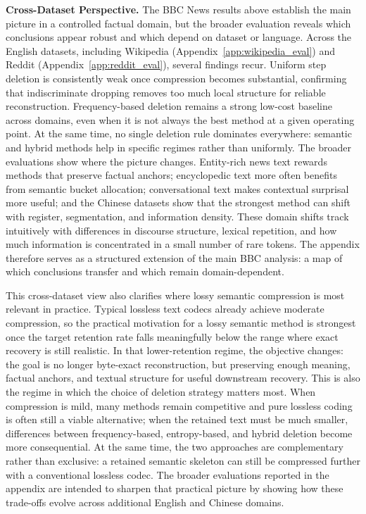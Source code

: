\documentclass[11pt]{article}
\begin{document}
\textbf{Cross-Dataset Perspective.}
The BBC News results above establish the main picture in a controlled factual domain, but the broader evaluation reveals which conclusions appear robust and which depend on dataset or language. Across the English datasets, including Wikipedia (Appendix~\ref{app:wikipedia_eval}) and Reddit (Appendix~\ref{app:reddit_eval}), several findings recur. Uniform step deletion is consistently weak once compression becomes substantial, confirming that indiscriminate dropping removes too much local structure for reliable reconstruction. Frequency-based deletion remains a strong low-cost baseline across domains, even when it is not always the best method at a given operating point. At the same time, no single deletion rule dominates everywhere: semantic and hybrid methods help in specific regimes rather than uniformly. The broader evaluations show where the picture changes. Entity-rich news text rewards methods that preserve factual anchors; encyclopedic text more often benefits from semantic bucket allocation; conversational text makes contextual surprisal more useful; and the Chinese datasets show that the strongest method can shift with register, segmentation, and information density. These domain shifts track intuitively with differences in discourse structure, lexical repetition, and how much information is concentrated in a small number of rare tokens. The appendix therefore serves as a structured extension of the main BBC analysis: a map of which conclusions transfer and which remain domain-dependent.

This cross-dataset view also clarifies where lossy semantic compression is most relevant in practice. Typical lossless text codecs already achieve moderate compression, so the practical motivation for a lossy semantic method is strongest once the target retention rate falls meaningfully below the range where exact recovery is still realistic. In that lower-retention regime, the objective changes: the goal is no longer byte-exact reconstruction, but preserving enough meaning, factual anchors, and textual structure for useful downstream recovery. This is also the regime in which the choice of deletion strategy matters most. When compression is mild, many methods remain competitive and pure lossless coding is often still a viable alternative; when the retained text must be much smaller, differences between frequency-based, entropy-based, and hybrid deletion become more consequential. At the same time, the two approaches are complementary rather than exclusive: a retained semantic skeleton can still be compressed further with a conventional lossless codec. The broader evaluations reported in the appendix are intended to sharpen that practical picture by showing how these trade-offs evolve across additional English and Chinese domains.
\end{document}
